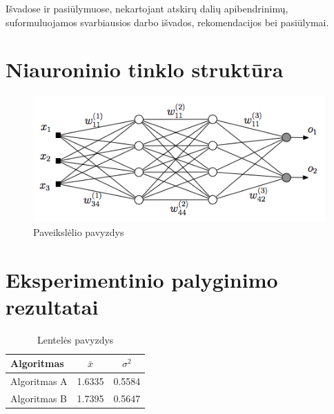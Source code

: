 \documentclass{VUMIFInfKursinis}
\begin{document}
Išvadose ir pasiūlymuose, nekartojant atskirų dalių apibendrinimų,
suformuluojamos svarbiausios darbo išvados, rekomendacijos bei pasiūlymai.

\printbibliography[heading=bibintoc] %

\appendix  %

\section{Niauroninio tinklo struktūra}
\begin{figure}[H]
    \centering
    \includegraphics[scale=0.5]{img/MLP}
    \caption{Paveikslėlio pavyzdys}   %
    \label{img:mlp}
\end{figure}


\section{Eksperimentinio palyginimo rezultatai}
\begin{table}[H]\footnotesize
  \centering
  \caption{Lentelės pavyzdys}    %
  {\begin{tabular}{|l|c|c|} \hline
    Algoritmas & $\bar{x}$ & $\sigma^{2}$ \\
    \hline
    Algoritmas A  & 1.6335    & 0.5584       \\
    Algoritmas B  & 1.7395    & 0.5647       \\
    \hline
  \end{tabular}}
  \label{tab:table example}
\end{table}
\end{document}
